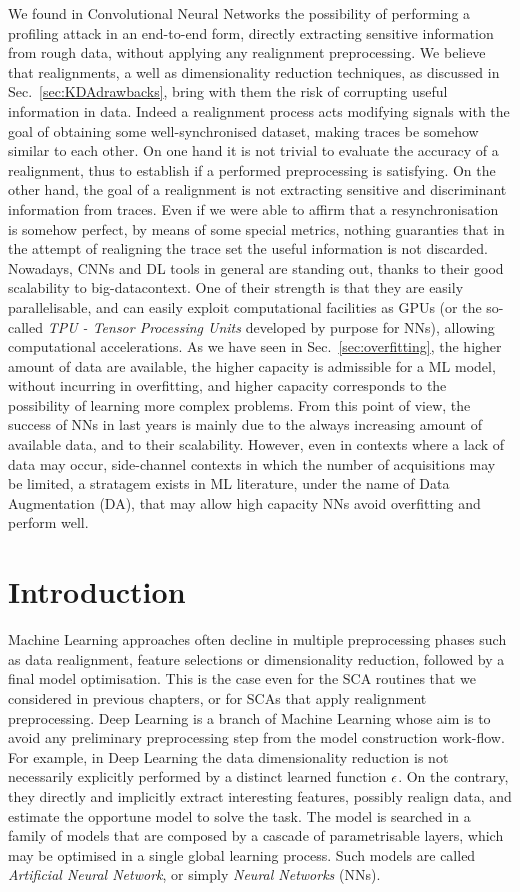 We found in Convolutional Neural Networks the possibility of performing a profiling attack in an end-to-end form, directly extracting sensitive information from rough data, without applying any realignment preprocessing. We believe that realignments, a well as dimensionality reduction techniques, as discussed in Sec.~\ref{sec:KDAdrawbacks}, bring with them the risk of corrupting useful information in data. Indeed a realignment process acts modifying signals with the goal of obtaining some well-synchronised dataset, making traces be somehow similar to each other. On one hand it is not trivial to evaluate the accuracy of a realignment, thus to establish if a performed preprocessing is satisfying. On the other hand, the goal of a realignment is not extracting sensitive and discriminant information from traces. Even if we were able to affirm that a resynchronisation is somehow  perfect, by means of some special metrics, nothing guaranties that in the attempt of realigning the trace set the useful information is not discarded. Nowadays, CNNs and DL tools in general are standing out, thanks to their good scalability to \textquotedbl big-data\textquotedbl context. One of their strength is that they are easily parallelisable, and can easily exploit computational facilities as GPUs (or the so-called \emph{TPU - Tensor Processing Units} developed by purpose for NNs), allowing computational accelerations. As we have seen in Sec.~\ref{sec:overfitting}, the higher amount of data are available, the higher capacity is admissible for a ML model, without incurring in overfitting, and higher capacity corresponds to the possibility of learning more complex problems. From this point of view, the success of NNs in last years is mainly due to the always increasing amount of available data, and to their scalability. However, even in contexts where a lack of data may occur, \eg side-channel contexts in which the number of acquisitions may be limited, a stratagem exists in ML literature, under the name of Data Augmentation (DA), that may allow high capacity NNs avoid overfitting and perform well. 

\section{Introduction}
Machine Learning approaches often decline in multiple preprocessing phases such as data realignment, feature selections or dimensionality reduction, followed by a final model optimisation. This is the case even for the SCA routines that we considered in previous chapters, or for SCAs that apply realignment preprocessing. Deep Learning is a branch of Machine Learning whose aim is to avoid any preliminary preprocessing step from the model construction work-flow. For example, in Deep Learning the data dimensionality reduction is not necessarily explicitly performed by a distinct learned  function $\epsilon$. On the contrary, they directly and implicitly extract interesting features, possibly realign data, and estimate the opportune model to solve the task. The model is searched in a family of models that are composed by a cascade of parametrisable layers, which may be optimised in a single global learning process. Such models are called \emph{Artificial Neural Network}, or simply \emph{Neural Networks} (NNs). 

